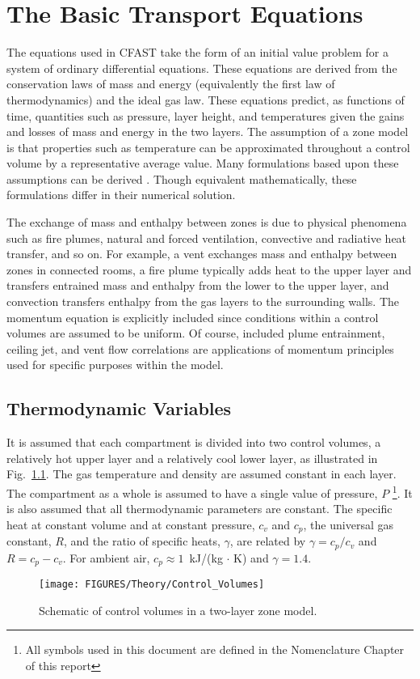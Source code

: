 \documentclass[12pt]{book}
\begin{document}
\chapter{The Basic Transport Equations}
\label{sec:Theory_Chapter}

The equations used in CFAST take the form of an initial value problem for a system of ordinary differential equations. These equations are derived from the conservation laws of mass and energy (equivalently the first law of thermodynamics) and the ideal gas law. These equations predict, as functions of time, quantities such as pressure, layer height, and temperatures given the gains and losses of mass and energy in the two layers. The assumption of a zone model is that properties such as temperature can be approximated throughout a control volume by a representative average value. Many formulations based upon these assumptions can be derived \cite{Forney:1994}. Though equivalent mathematically, these formulations differ in their numerical solution.

The exchange of mass and enthalpy between zones is due to physical phenomena such as fire plumes, natural and forced ventilation, convective and radiative heat transfer, and so on. For example, a vent exchanges mass and enthalpy between zones in connected rooms, a fire plume typically adds heat to the upper layer and transfers entrained mass and enthalpy from the lower to the upper layer, and convection transfers enthalpy from the gas layers to the surrounding walls. The momentum equation is explicitly included since conditions within a control volumes are assumed to be uniform. Of course, included plume entrainment, ceiling jet, and vent flow correlations are applications of momentum principles used for specific purposes within the model.

\section{Thermodynamic Variables}


It is assumed that each compartment is divided into two control volumes, a relatively hot upper layer and a relatively cool lower layer, as illustrated in Fig.~\ref{fig:Control_Volumes}. The gas temperature and density are assumed constant in each layer. The compartment as a whole is assumed to have a single value of pressure, $P$ \footnote{All symbols used in this document are defined in the Nomenclature Chapter of this report}. It is also assumed that all thermodynamic parameters are constant. The specific heat at constant volume and at constant pressure, $c_v$ and $c_p$, the universal gas constant, $R$, and the ratio of specific heats, $\gamma$, are related by $\gamma = c_p / c_v$ and $R = c_p- c_v$.  For ambient air, $c_p \approx 1$~kJ/(kg $\cdot$ K) and $\gamma = 1.4$.
\begin{figure}[h]
\begin{center}
\texttt{[image: FIGURES/Theory/Control\_Volumes]}\\
\end{center}
\caption{Schematic of control volumes in a two-layer zone model.}
 \label{fig:Control_Volumes}
\end{figure}
\end{document}
